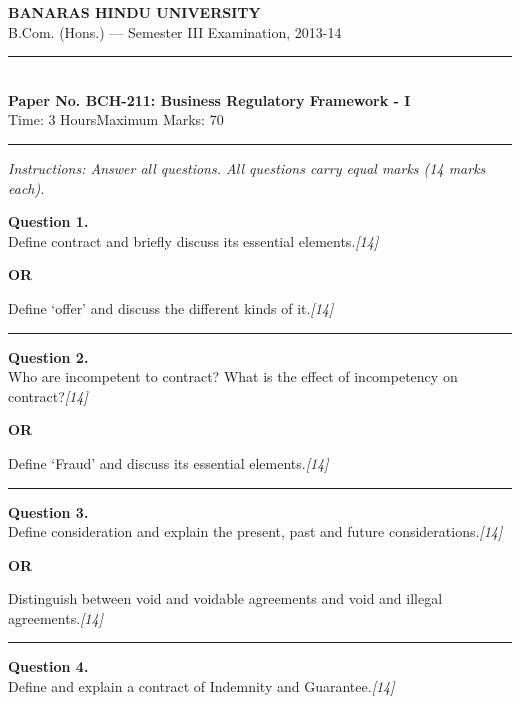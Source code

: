 \documentclass[11pt,a4paper]{article}
\newcommand{\pts}[1]{\hfill   \textit{[#1]}}
\begin{document}
\begin{center}
  {\large\bfseries BANARAS HINDU UNIVERSITY}\\[2pt]
  {\normalsize B.Com. (Hons.) --- Semester III Examination, 2013-14}\\[6pt]
  \rule{0.8\linewidth}{0.5pt}\\[6pt]
  {\large\bfseries Paper No. BCH-211: Business Regulatory Framework - I}\\[4pt]
  {\normalsize Time: 3 Hours\hfill Maximum Marks: 70}
\end{center}

\rule{\linewidth}{0.4pt}

\smallskip



\noindent   \textit{Instructions: Answer all questions. All questions carry equal marks (14 marks each).}

\bigskip




\noindent   \textbf{Question 1.} \\
Define contract and briefly discuss its essential elements.\pts{14}

\centerline{   \textbf{OR}}

Define `offer' and discuss the different kinds of it.\pts{14}

\medskip\rule{\linewidth}{0.2pt}




\noindent   \textbf{Question 2.} \\
Who are incompetent to contract? What is the effect of incompetency on contract?\pts{14}

\centerline{   \textbf{OR}}

Define `Fraud' and discuss its essential elements.\pts{14}

\medskip\rule{\linewidth}{0.2pt}




\noindent   \textbf{Question 3.} \\
Define consideration and explain the present, past and future considerations.\pts{14}

\centerline{   \textbf{OR}}

Distinguish between void and voidable agreements and void and illegal agreements.\pts{14}

\medskip\rule{\linewidth}{0.2pt}




\noindent   \textbf{Question 4.} \\
Define and explain a contract of Indemnity and Guarantee.\pts{14}
\end{document}
